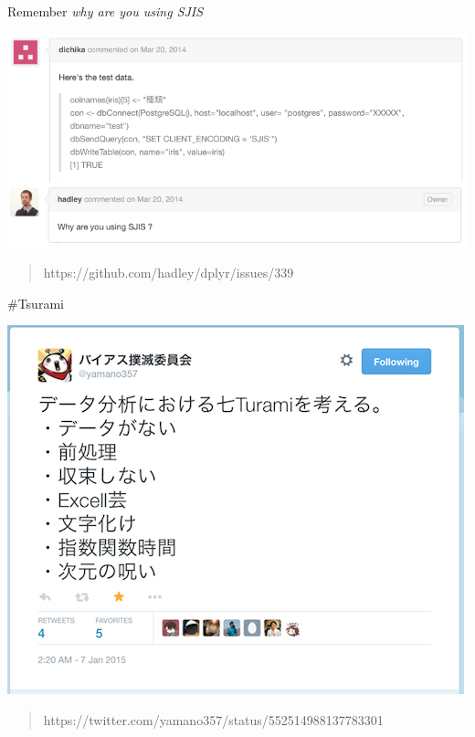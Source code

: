\documentclass[17pt,ignorenonframetext,]{beamer}
\begin{document}
\begin{frame}{\large{Remember \textit{\textcolor{Black1}{why are you using SJIS}}}}

\includegraphics{images/why_are_u_using_sjis.png}

\begin{quote}
\scriptsize{\faLink https://github.com/hadley/dplyr/issues/339}
\end{quote}

\end{frame}

\begin{frame}{\#Tsurami}

\includegraphics{images/tsurami.png}

\begin{quote}
\scriptsize{\faLink https://twitter.com/yamano357/status/552514988137783301}
\end{quote}

\end{frame}
\end{document}
